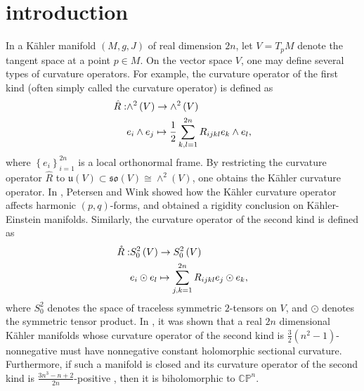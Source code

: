 \documentclass{amsart}
\theoremstyle{definition}
\theoremstyle{remark}
\numberwithin{equation}{section}
\begin{document}
\section{introduction}
In a K{\"a}hler manifold $\left( {M,g,J} \right)$ of real dimension $2n$, let $V=T_{p} M$ denote the tangent space at a point $p\in M$. On the vector space $V$, one may define several types of curvature operators. For example, the curvature operator of the first kind \cite{tachibana_theorem_1974} (often simply called the curvature operator) is defined as
\begin{align*}
  \hat R:&{ \wedge ^2}\left( V \right) \to { \wedge ^2}\left( V \right) \hfill \\
  &{e_i} \wedge {e_j} \mapsto \frac{1}{2}\sum\limits_{k,l = 1}^{2n} {{R_{ijkl}}{e_k} \wedge {e_l}},
\end{align*}
where $\left\{e_i \right\}_{i=1}^{2n}$ is a local orthonormal frame. By restricting the curvature operator $\hat R$ to $\mathfrak{u}\left( V \right)  \subset \mathfrak{so}\left( {V} \right)  \cong { \wedge ^2}\left( V \right)$, one obtains the K{\"a}hler curvature operator. In \cite{petersen2021vanishing}, Petersen and Wink showed how the K{\"a}hler curvature operator affects harmonic $\left( p,q \right)$-forms, and obtained a rigidity conclusion on K{\"a}hler-Einstein manifolds.
Similarly, the curvature operator of the second kind is defined as
\begin{align*}
  \mathring{R}:&S_0^2\left( V \right) \to S_0^2\left( V \right) \hfill \\
  &{e_i} \odot {e_l} \mapsto \sum\limits_{j,k = 1}^{2n} {{R_{ijkl}}{e_j} \odot {e_k}},
\end{align*}
where $S_0^2$ denotes the space of traceless symmetric $2$-tensors on $V$, and $\odot$ denotes the symmetric tensor product.
In \cite{li2023kahler}, it was shown that a real $2n$ dimensional K{\"a}hler manifolds whose curvature operator of the second kind is $\frac{3}{2}\left( {{n^2} - 1} \right)$-nonnegative must have nonnegative constant holomorphic sectional curvature. Furthermore, if such a manifold is closed and its curvature operator of the second kind is $\frac{{3{n^3} - n + 2}}{{2n}}$-positive , then it is biholomorphic to $\mathbb{CP}^n$.
\end{document}
